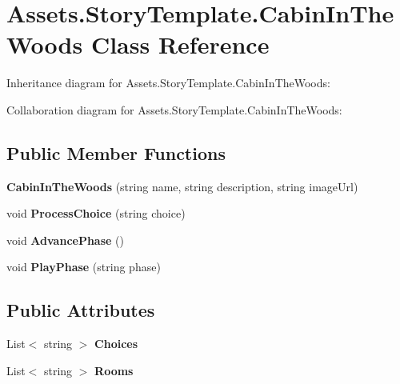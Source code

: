 \hypertarget{classAssets_1_1StoryTemplate_1_1CabinInTheWoods}{}\section{Assets.\+Story\+Template.\+Cabin\+In\+The\+Woods Class Reference}
\label{classAssets_1_1StoryTemplate_1_1CabinInTheWoods}


Inheritance diagram for Assets.\+Story\+Template.\+Cabin\+In\+The\+Woods\+:


Collaboration diagram for Assets.\+Story\+Template.\+Cabin\+In\+The\+Woods\+:
\subsection*{Public Member Functions}
\begin{DoxyCompactItemize}
\item 
{\bfseries Cabin\+In\+The\+Woods} (string name, string description, string image\+Url)\hypertarget{classAssets_1_1StoryTemplate_1_1CabinInTheWoods_aeeff8d67d43a9ec2f30b2de1e4b1ff1a}{}\label{classAssets_1_1StoryTemplate_1_1CabinInTheWoods_aeeff8d67d43a9ec2f30b2de1e4b1ff1a}

\item 
void {\bfseries Process\+Choice} (string choice)\hypertarget{classAssets_1_1StoryTemplate_1_1CabinInTheWoods_a02753cf4becc3029575668fe8c4f7747}{}\label{classAssets_1_1StoryTemplate_1_1CabinInTheWoods_a02753cf4becc3029575668fe8c4f7747}

\item 
void {\bfseries Advance\+Phase} ()\hypertarget{classAssets_1_1StoryTemplate_1_1CabinInTheWoods_ae2da1609e997b2406f3b4a8666a6fa31}{}\label{classAssets_1_1StoryTemplate_1_1CabinInTheWoods_ae2da1609e997b2406f3b4a8666a6fa31}

\item 
void {\bfseries Play\+Phase} (string phase)\hypertarget{classAssets_1_1StoryTemplate_1_1CabinInTheWoods_a51059f18613b2c49aaff7cdaee02665b}{}\label{classAssets_1_1StoryTemplate_1_1CabinInTheWoods_a51059f18613b2c49aaff7cdaee02665b}

\end{DoxyCompactItemize}
\subsection*{Public Attributes}
\begin{DoxyCompactItemize}
\item 
List$<$ string $>$ {\bfseries Choices}\hypertarget{classAssets_1_1StoryTemplate_1_1CabinInTheWoods_a86f51cd85f14ea0efd4a9e5d9a5e2099}{}\label{classAssets_1_1StoryTemplate_1_1CabinInTheWoods_a86f51cd85f14ea0efd4a9e5d9a5e2099}

\item 
List$<$ string $>$ {\bfseries Rooms}\hypertarget{classAssets_1_1StoryTemplate_1_1CabinInTheWoods_a14a23d102767f6f5cbe91e03a8815cc0}{}\label{classAssets_1_1StoryTemplate_1_1CabinInTheWoods_a14a23d102767f6f5cbe91e03a8815cc0}

\end{DoxyCompactItemize}
